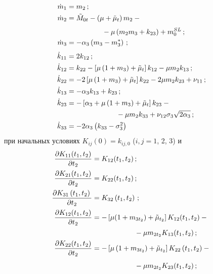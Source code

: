 \begin{multicols}{2}
\noindent
 \begin{align}
 \dot m_1 &= m_2\,;\notag\\
 \dot m_2 &= \tilde M_{0t} - \left(\mu +\tilde\mu_t\right) m_2 -{}\notag\\[-6pt]
& \label{e19}\\[-6pt]
 &\hspace*{50pt}{}-\mu \left(m_2 m_3 + k_{23}\right)+m_0^{SL}\,;\notag\\
  \dot m_3 &=-\alpha_3 \left(m_3-m_3^*\right)\,;\notag\\[3pt]
 \dot k_{11} &= 2 k_{12}\,;\notag\\
 \dot k_{12} &= k_{22} -\left[\mu\left(1+m_3 \right)+\tilde\mu_t\right] k_{12} -\mu m_2 k_{13}\,;\notag\\
 \dot k_{22} &= - 2\left[\mu\left(1+m_3\right) +\tilde\mu_t\right] k_{22} - 2 \mu m_2 k_{23} +\nu_{11}\,;\notag\\
 \dot k_{13} &= -\alpha_3 k_{13} + k_{23}\,;\label{e20}\\
 \dot k_{23}&= -\left[\alpha_3 +\mu\left(1+m_3 \right)+\tilde\mu_t\right] k_{23} -{}\notag\\
 &\hspace*{70pt}{}- \mu m_2 k_{33}+ \nu_{12}\sigma_3\sqrt{2\alpha_3}\,;\notag\\
 \dot k_{33} &=-2\alpha_3 \left(k_{33} -\sigma_3^2\right)\notag
 \end{align}
при начальных условиях $K_{ij} (0)= k_{ij,0}$ ($i,j= 1$, 2, 3) и
 \begin{align}
 \fr{\prt K_{11} (t_1, t_2)}{ \prt t_2} &= K_{12} (t_1, t_2)\,;\notag\\
 \fr{\prt K_{21} (t_1, t_2)}{ \prt t_2} &= K_{22} (t_1, t_2)\,;\notag\\
 \fr{\prt K_{31} \left(t_1, t_2\right)}{\prt t_2} &=K_{32}\left(t_1, t_2\right)\,;\notag\\
 \fr{\prt K_{12} (t_1, t_2)}{\prt t_2} &=-\left[\mu(1+m_{3t_2} )+\tilde\mu_{t_2}\right] K_{12}(t_1, t_2) -{}\notag\\
 &\hspace*{60pt}{}-\mu m_{2t_2} K_{13} (t_1, t_2)\,;\notag\\
 \fr{\prt K_{22} (t_1, t_2)}{ \prt t_2} &=-\left[\mu\left(1+m_{3t_2} \right)+\tilde\mu_{t_2}\right] K_{22} \left(t_1, t_2\right) -{}\notag\\[-6pt]
& \label{e21}\\[-6pt]
 &\hspace*{60pt}{}-\mu m_{2t_2} K_{23} (t_1, t_2)\,;\notag\\

\end{align}
\end{multicols}
